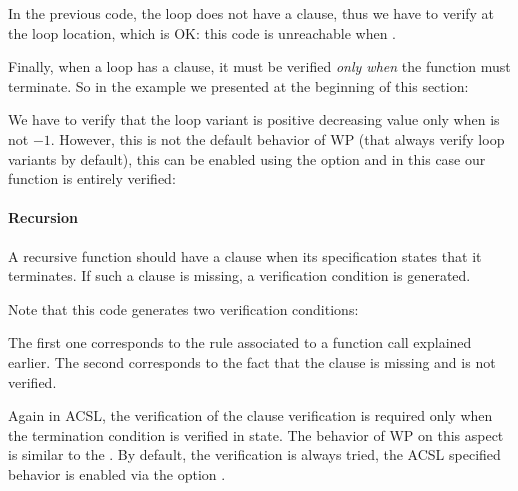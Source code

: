 


In the previous code, the loop does not have a 
clause, thus we have to verify 
at the loop location, which is OK: this code is unreachable when
.



Finally, when a loop has a  clause, it must be
verified {\em only when} the function must terminate. So in the example
we presented at the beginning of this section:




We have to verify that the loop variant is positive decreasing value only
when  is not $-1$. However, this is not the default
behavior of WP (that always verify loop variants by default), this can
be enabled using the option  and
in this case our function is entirely verified:




\paragraph{Recursion}


A recursive function should have a  clause when its
specification states that it terminates. If such a clause is missing, a
verification condition  is generated.




Note that this code generates two verification conditions:




The first one corresponds to the rule associated to a function call explained
earlier. The second corresponds to the fact that the 
clause is missing and is not verified.


Again in ACSL, the verification of the  clause
verification is required only when the termination condition is verified in
 state. The behavior of WP on this aspect is similar to the
. By default, the verification is always tried, the
ACSL specified behavior is enabled via the option
.


